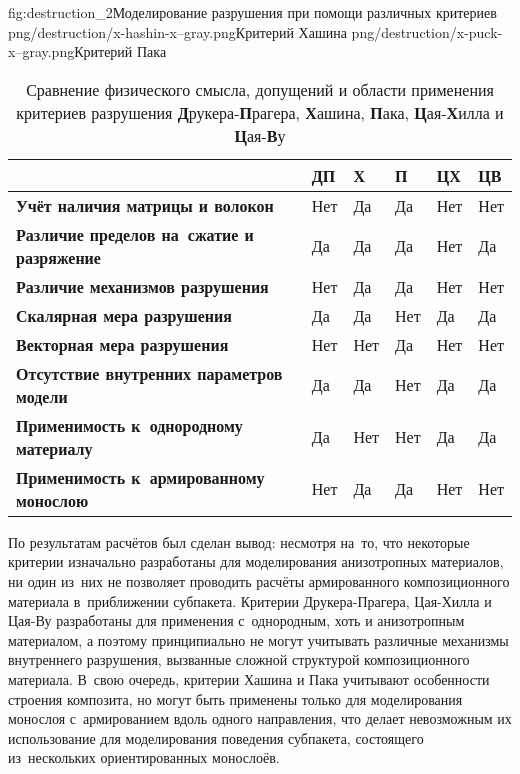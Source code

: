 \documentclass[a4paper,14pt]{extarticle}
\numberwithin{equation}{section}
\begin{document}
        \twofigsH
            {fig:destruction_2}{Моделирование разрушения при помощи различных критериев}
            {png/destruction/x-hashin-x--gray.png}{Критерий Хашина}
            {png/destruction/x-puck-x--gray.png}{Критерий Пака}

        \begin{table}[t!]
            \centering
            \begin{tabular}{| L{9cm} | C{1.0cm} | C{1.0cm} | C{1.0cm} | C{1.0cm} | C{1.0cm} |}
                \hline
                & \textbf{ДП} & \textbf{Х} & \textbf{П} & \textbf{ЦХ} & \textbf{ЦВ} \\
                \hline
                \textbf{Учёт наличия матрицы и волокон} & Нет & Да & Да & Нет & Нет \\
                \hline
                \textbf{Различие пределов на~сжатие и разряжение} & Да & Да & Да & Нет & Да \\
                \hline
                \textbf{Различие механизмов разрушения} & Нет & Да & Да & Нет & Нет \\
                \hline
                \textbf{Скалярная мера разрушения} & Да & Да & Нет & Да & Да \\
                \hline
                \textbf{Векторная мера разрушения} & Нет & Нет & Да & Нет & Нет \\
                \hline
                \textbf{Отсутствие внутренних параметров модели} & Да & Да & Нет & Да & Да \\
                \hline
                \textbf{Применимость к~однородному материалу} & Да & Нет & Нет & Да & Да \\
                \hline
                \textbf{Применимость к~армированному монослою} & Нет & Да & Да & Нет & Нет \\
                \hline
            \end{tabular}
            \caption{Сравнение физического смысла, допущений и области применения критериев разрушения
                     \textbf{Д}рукера-\textbf{П}рагера, \textbf{Х}ашина, \textbf{П}ака,
                     \textbf{Ц}ая-\textbf{Х}илла и \textbf{Ц}ая-\textbf{В}у}
            \label{table:failure_criteria}
        \end{table}

        По результатам расчётов был сделан вывод: несмотря на~то, что некоторые критерии изначально разработаны для
        моделирования анизотропных материалов, ни один из~них не позволяет проводить расчёты армированного
        композиционного материала в~приближении субпакета. Критерии  Друкера-Прагера, Цая-Хилла и Цая-Ву разработаны
        для применения с~однородным, хоть и анизотропным материалом, а поэтому принципиально не могут учитывать различные
        механизмы внутреннего разрушения, вызванные сложной структурой композиционного материала. В~свою очередь,
        критерии Хашина и Пака учитывают особенности строения композита, но могут быть применены только для
        моделирования монослоя с~армированием вдоль одного направления, что делает невозможным их использование для
        моделирования поведения субпакета, состоящего из~нескольких ориентированных монослоёв.
\end{document}

